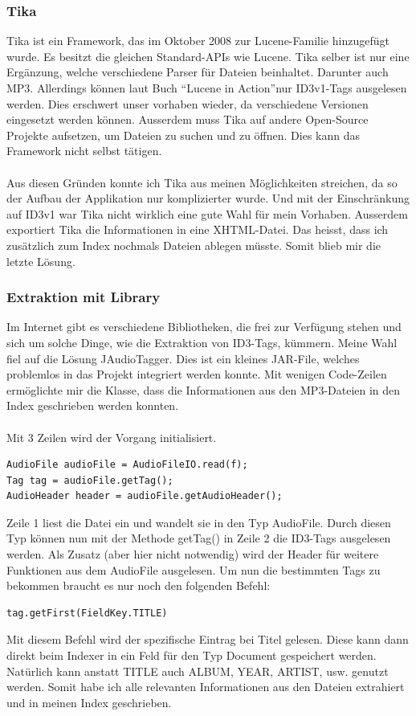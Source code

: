 \documentclass[12pt,a4paper,ngerman]{report}
\begin{document}
\subsubsection{Tika}
Tika ist ein Framework, das im Oktober 2008 zur Lucene-Familie hinzugefügt wurde. Es besitzt die gleichen Standard-APIs wie Lucene. Tika selber ist nur eine Ergänzung, welche verschiedene Parser für Dateien beinhaltet. Darunter auch MP3. Allerdings können laut Buch \textquotedblleft Lucene in Action\textquotedblright nur ID3v1-Tags ausgelesen werden. Dies erschwert unser vorhaben wieder, da verschiedene Versionen eingesetzt werden können. Ausserdem muss Tika auf andere Open-Source Projekte aufsetzen, um Dateien zu suchen und zu öffnen. Dies kann das Framework nicht selbst tätigen.\\
\\
Aus diesen Gründen konnte ich Tika aus meinen Möglichkeiten streichen, da so der Aufbau der Applikation nur komplizierter wurde. Und mit der Einschränkung auf ID3v1 war Tika nicht wirklich eine gute Wahl für mein Vorhaben. Ausserdem exportiert Tika die Informationen in eine XHTML-Datei. Das heisst, dass ich zusätzlich zum Index nochmals Dateien ablegen müsste. Somit blieb mir die letzte Lösung.
\subsubsection{Extraktion mit Library}
Im Internet gibt es verschiedene Bibliotheken, die frei zur Verfügung stehen und sich um solche Dinge, wie die Extraktion von ID3-Tags, kümmern. Meine Wahl fiel auf die Lösung JAudioTagger. Dies ist ein kleines JAR-File, welches problemlos in das Projekt integriert werden konnte. Mit wenigen Code-Zeilen ermöglichte mir die Klasse, dass die Informationen aus den MP3-Dateien in den Index geschrieben werden konnten.
\\
\\
Mit 3 Zeilen wird der Vorgang initialisiert. 
\begin{lstlisting}
AudioFile audioFile = AudioFileIO.read(f);
Tag tag = audioFile.getTag();
AudioHeader header = audioFile.getAudioHeader();
\end{lstlisting}
Zeile 1 liest die Datei ein und wandelt sie in den Typ AudioFile. Durch diesen Typ können nun mit der Methode getTag() in Zeile 2 die ID3-Tags ausgelesen werden. Als Zusatz (aber hier nicht notwendig) wird der Header für weitere Funktionen aus dem AudioFile ausgelesen. Um nun die bestimmten Tags zu bekommen braucht es nur noch den folgenden Befehl:
\begin{lstlisting}
tag.getFirst(FieldKey.TITLE)
\end{lstlisting}
Mit diesem Befehl wird der spezifische Eintrag bei Titel gelesen. Diese kann dann direkt beim Indexer in ein Feld für den Typ Document gespeichert werden. Natürlich kann anstatt TITLE auch ALBUM, YEAR, ARTIST, usw. genutzt werden. Somit habe ich alle relevanten Informationen aus den Dateien extrahiert und in meinen Index geschrieben.
\newpage
\end{document}
